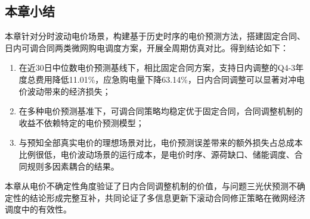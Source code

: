 \subsection{本章小结}
本章针对分时波动电价场景，构建基于历史时序的电价预测方法，搭建固定合同、日内可调合同两类微网购电调度方案，开展全周期仿真对比。得到结论如下：
\begin{enumerate}
    \item 在近30日中位数电价预测基线下，相比固定合同方案，支持日内调整的Q4-3年度总费用降低11.01\%，应急购电量下降63.14\%，日内合同调整可以显著对冲电价波动带来的经济损失；
    \item 在多种电价预测基准下，可调合同策略均稳定优于固定合同，合同调整机制的收益不依赖特定的电价预测模型；
    \item 与预知全部真实电价的理想场景对比，电价预测误差带来的额外损失占总成本比例很低，电价波动场景的运行成本，是电价时序、源荷缺口、储能调度、合同规则多因素耦合的结果。
\end{enumerate}

本章从电价不确定性角度验证了日内合同调整机制的价值，与问题三光伏预测不确定性的结论形成完整互补，共同论证了多信息更新下滚动合同修正策略在微网经济调度中的有效性。


